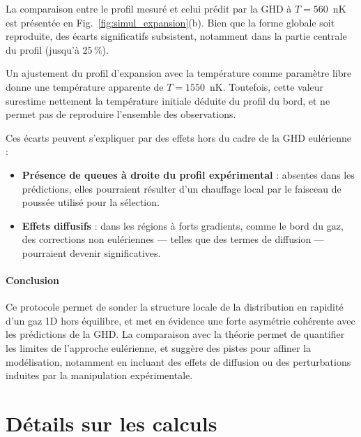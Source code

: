 La comparaison entre le profil mesuré et celui prédit par la GHD à $T=560$~nK est présentée en Fig.~\ref{fig:simul_expansion}(b). Bien que la forme globale soit reproduite, des écarts significatifs subsistent, notamment dans la partie centrale du profil (jusqu’à 25\,\%).

Un ajustement du profil d’expansion avec la température comme paramètre libre donne une température apparente de $T = 1550$~nK. Toutefois, cette valeur surestime nettement la température initiale déduite du profil du bord, et ne permet pas de reproduire l’ensemble des observations.

Ces écarts peuvent s’expliquer par des effets hors du cadre de la GHD eulérienne :
\begin{itemize}
    \item \textbf{Présence de queues à droite du profil expérimental} : absentes dans les prédictions, elles pourraient résulter d’un chauffage local par le faisceau de poussée utilisé pour la sélection.
    \item \textbf{Effets diffusifs} : dans les régions à forts gradients, comme le bord du gaz, des corrections non eulériennes — telles que des termes de diffusion — pourraient devenir significatives.
\end{itemize}

\paragraph{Conclusion}

Ce protocole permet de sonder la structure locale de la distribution en rapidité d’un gaz 1D hors équilibre, et met en évidence une forte asymétrie cohérente avec les prédictions de la GHD. La comparaison avec la théorie permet de quantifier les limites de l’approche eulérienne, et suggère des pistes pour affiner la modélisation, notamment en incluant des effets de diffusion ou des perturbations induites par la manipulation expérimentale.



\section{Détails sur les calculs}

 





